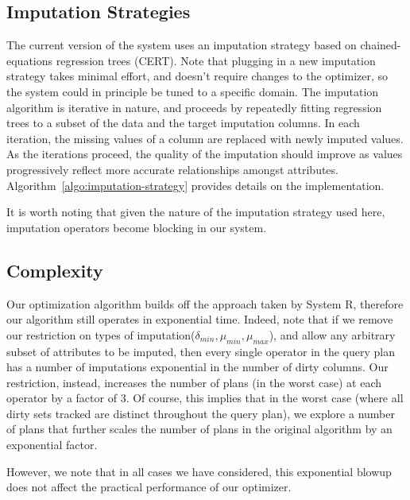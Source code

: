 





\subsection{Imputation Strategies}
The current version of the system uses an imputation strategy based on chained-equations regression trees (CERT)\cite{burgette2010multiple}. Note that plugging in a new
imputation strategy takes minimal effort, and doesn't require changes to the optimizer, so the system could in principle be tuned to a specific domain.
The imputation algorithm is iterative in nature, and proceeds by repeatedly fitting regression trees to a subset of the data and the target imputation columns.
In each iteration, the missing values of a column are replaced with newly imputed values. As the iterations proceed, the quality of the imputation
should improve as values progressively reflect more accurate relationships amongst attributes. Algorithm~\ref{algo:imputation-strategy}
provides details on the implementation.

It is worth noting that given the nature of the imputation strategy used here, imputation operators become blocking in our system.







\subsection{Complexity}
Our optimization algorithm builds off the approach taken by System R\cite{blasgen1981system}, therefore our algorithm still operates in exponential time. Indeed, 
note that if we remove our restriction on types of imputation($\delta_{min}, \mu_{min}, \mu_{max}$), and allow any arbitrary subset of attributes to be imputed,
then every single operator in the query plan has a number of imputations exponential in the number of dirty columns. Our restriction, instead, increases the number
of plans (in the worst case) at each operator by a factor of 3. Of course, this implies that in the worst case (where all dirty sets tracked are distinct throughout the query plan),
we explore a number of plans that further scales the number of plans in the original algorithm by an exponential factor.

However, we note that in all cases we have considered, this exponential blowup does not affect the practical performance of our optimizer.

